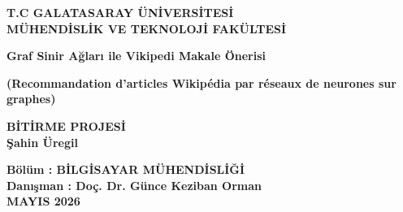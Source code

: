 \begin{titlepage}
    \begin{center}
        \large
        \vspace{-0.5cm}
        \textbf{T.C GALATASARAY ÜN\.{I}VERS\.{I}TES\.{I}}\\
        \textbf{MÜHEND\.{I}SL\.{I}K VE TEKNOLOJ\.{I} FAKÜLTES\.{I}}
        \vspace{3.0cm}

        \textbf{Graf Sinir Ağları ile Vikipedi Makale Önerisi}

        \textbf{(Recommandation d'articles Wikipédia par réseaux de neurones sur graphes)}

        \vspace{1.5cm}

        \textbf{B\.{I}T\.{I}RME PROJES\.{I}}\\

        \textbf{Şahin Üregil}

        \vspace{1.5cm}

        \textbf{Bölüm : B\.{I}LG\.{I}SAYAR MÜHEND\.{I}SL\.{I}\u{G}\.{I}}\\
        \textbf{Dan{\i}\c{s}man : Doç. Dr. Günce Keziban Orman}\\
        \vfill
        \textbf{MAYIS 2026}

    \end{center}
\end{titlepage}
\restoregeometry